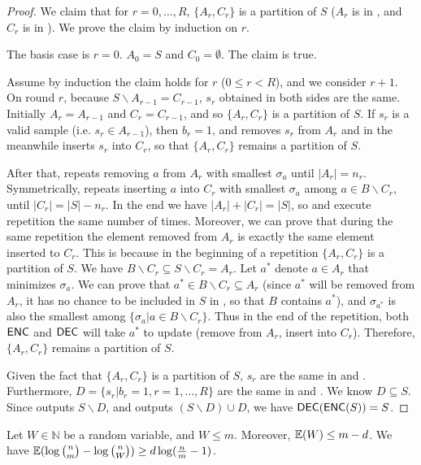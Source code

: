 \begin{proof}
  We claim that for $r=0,\ldots, R$, $\{A_r, C_r\}$ is a partition of $S$ ($A_r$ is in \enc, and $C_r$ is in \dec). We prove the claim by induction on $r$.
  
  The basis case is $r=0$. $A_0=S$ and $C_0=\emptyset$. The claim is true.
  
  Assume by induction the claim holds for $r$ ($0\le r < R$), and we consider $r+1$. 
  On round $r$, because $S\backslash A_{r-1}=C_{r-1}$, $s_r$ obtained in both sides are the same. 
  Initially $A_r=A_{r-1}$ and $C_r=C_{r-1}$, and so $\{A_r,C_r\}$ is a partition of $S$. 
  If $s_r$ is a valid sample (i.e. $s_r\in A_{r-1}$), then $b_r=1$, and \enc removes $s_r$ from $A_r$ and in the meanwhile \dec inserts $s_r$ into $C_r$, so that $\{A_r, C_r\}$ remains a partition of $S$. 
  
  After that, \enc repeats removing $a$ from $A_r$ with smallest $\sigma_a$ until $|A_r|=n_r$. 
  Symmetrically, \dec repeats inserting $a$ into $C_r$ with smallest $\sigma_a$ among $a\in B\backslash C_r$, until $|C_r|=|S|-n_r$. 
  In the end we have $|A_r|+|C_r|=|S|$, so \enc and \dec execute repetition the same number of times. 
  Moreover, we can prove that during the same repetition the element removed from $A_r$ is exactly the same element inserted to $C_r$. 
  This is because in the beginning of a repetition $\{A_r, C_r\}$ is a partition of $S$. 
  We have $B\backslash C_r\subseteq S\backslash C_r=A_r$. Let $a^*$ denote  $a\in A_r$ that minimizes $\sigma_a$. 
  We can prove that $a^*\in B\backslash C_r\subseteq A_r$ (since $a^*$ will be removed from $A_r$, it has no chance to be included in $S$ in \enc, so that $B$ contains $a^*$), and $\sigma_{a^*}$ is also the smallest among $\{\sigma_a|a\in B\backslash C_r\}$. 
  Thus in the end of the repetition, both $\textsf{ENC}$ and $\textsf{DEC}$ will take $a^{*}$ to update (remove from $A_r$, insert into $C_r$). 
  Therefore, $\{A_r, C_r\}$ remains a partition of $S$.
  
  Given the fact that $\{A_r, C_r\}$ is a partition of $S$, $s_r$ are the same in \enc and \dec. 
  Furthermore, $D=\{s_r|b_r=1,r=1,\ldots, R\}$ are the same in \enc and \dec.
  We know $D\subseteq S$. 
  Since \enc outputs $S\backslash D$, and \dec outputs $(S\backslash D)\cup D$, we have $\textsf{DEC}(\textsf{ENC}(S))=S$. 
\end{proof}

\begin{lemma} \label{lemma:bits-saving}
  Let $W\in \mathbb{N}$ be a random variable, and $W\le m$. 
  Moreover, $\operatorname*{\mathbb{E}}(W)\le m-d$. 
  We have $\operatorname*{\mathbb{E}}(\log {n \choose m}-\log {n \choose W})\ge d \log (\frac{n}{m}-1)$.
\end{lemma}

